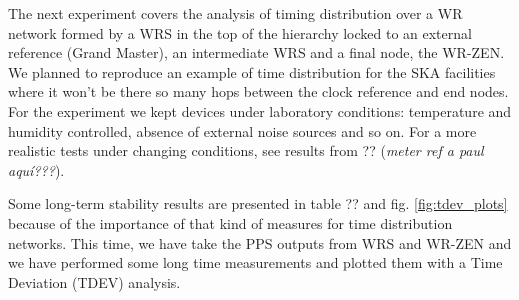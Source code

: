 The next experiment covers the analysis of timing distribution over a WR network formed by a WRS in the top of the hierarchy locked to an external reference (Grand Master), an intermediate WRS and a final node, the WR-ZEN. We planned to reproduce an example of time distribution for the SKA facilities where it won't be there so many hops between the clock reference and end nodes. For the experiment we kept devices under laboratory conditions: temperature and humidity controlled, absence of external noise sources and so on. For a more realistic tests under changing conditions, see results from ?? (\textit{meter ref a paul aquí???}).


Some long-term stability results are presented in table ?? and fig. \ref{fig:tdev_plots} because of the importance of that kind of measures for time distribution networks. This time, we have take the PPS outputs from WRS and WR-ZEN and we have performed some long time measurements and plotted them with a Time Deviation (TDEV) analysis.

